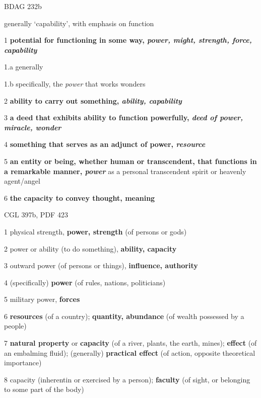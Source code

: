 				\begin{compactdesc}
					\item[BDAG 232b] \textbf{}
						\begin{compactitem}
							\item generally `capability', with emphasis on function
							\item[1] \textbf{potential for functioning in some way, \textit{power, might, strength, force, capability}}
							\item[1.a] generally
							\item[1.b] specifically, the \textit{power} that works wonders
							\item[2] \textbf{ability to carry out something, \textit{ability, capability}}
							\item[3] \textbf{a deed that exhibits ability to function powerfully, \textit{deed of power, miracle, wonder}}
							\item[4] \textbf{something that serves as an adjunct of power, \textit{resource}}
							\item[5] \textbf{an entity or being, whether human or transcendent, that functions in a remarkable manner, \textit{power}} as a personal transcendent spirit or heavenly agent/angel
							\item[6] \textbf{the capacity to convey thought, meaning}
						\end{compactitem}
					\item[CGL 397b, PDF 423] \textbf{}
						\begin{compactitem}
							\item[1] physical strength, \textbf{power, strength} (of persons or gods)
							\item[2] power or ability (to do something), \textbf{ability, capacity}
							\item[3] outward power (of persons or things), \textbf{influence, authority}
							\item[4] (specifically) \textbf{power} (of rules, nations, politicians)
							\item[5] military power, \textbf{forces}
							\item[6] \textbf{resources} (of a country); \textbf{quantity, abundance} (of wealth possessed by a people)
							\item[7] \textbf{natural property} or \textbf{capacity} (of a river, plants, the earth, mines); \textbf{effect} (of an embalming fluid); (generally) \textbf{practical effect} (of action, opposite theoretical importance)
							\item[8] capacity (inherentin or exercised by a person); \textbf{faculty} (of sight, or belonging to some part of the body)

\end{compactitem}
\end{compactdesc}
